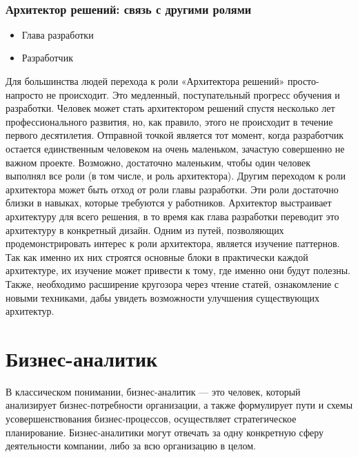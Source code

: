 \documentclass{../industrial-development}
\begin{document}
  ~\cite{Anatomy}

\begin{frame} \frametitle{Архитектор решений: связь с другими ролями}
  \begin{itemize}
	\item Глава разработки
	\item Разработчик
	\end{itemize}
\end{frame}

\lecturenotes
Для большинства людей перехода к роли «Архитектора решений» просто-напросто не происходит. Это медленный, поступательный прогресс обучения и разработки. Человек может стать архитектором решений спустя несколько лет профессионального развития, но, как правило, этого не происходит в течение первого десятилетия. 
Отправной точкой является тот момент, когда разработчик остается единственным человеком на очень маленьком, зачастую совершенно не важном проекте. Возможно, достаточно маленьким, чтобы один человек выполнял все роли (в том числе, и роль архитектора). 
Другим переходом к роли архитектора может быть отход от роли главы разработки. Эти роли достаточно близки в навыках, которые требуются у работников. Архитектор выстраивает архитектуру для всего решения, в то время как глава разработки переводит это архитектуру в конкретный дизайн. 
Одним из путей, позволяющих продемонстрировать интерес к роли архитектора, является изучение паттернов. Так как именно их них строятся основные блоки в практически каждой архитектуре, их изучение может привести к тому, где именно они будут полезны. Также, необходимо расширение кругозора через чтение статей, ознакомление с новыми техниками, дабы увидеть возможности улучшения существующих архитектур. 

\section{Бизнес-аналитик }

\lecturenotes

В классическом понимании, бизнес-аналитик — это человек, который анализирует бизнес-потребности организации, а также формулирует пути и схемы усовершенствования бизнес-процессов, осуществляет стратегическое планирование. Бизнес-аналитики могут отвечать за одну конкретную сферу деятельности компании, либо за всю организацию в целом.   ~\cite{Business}
\end{document}
